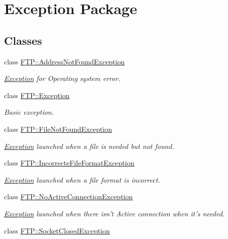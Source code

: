 \hypertarget{group__exception}{\section{Exception Package}
\label{group__exception}
}
\subsection*{Classes}
\begin{DoxyCompactItemize}
\item 
class \hyperlink{classFTP_1_1AddressNotFoundException}{F\-T\-P\-::\-Address\-Not\-Found\-Exception}
\begin{DoxyCompactList}\small\item\em \hyperlink{classFTP_1_1Exception}{Exception} for Operating system error. \end{DoxyCompactList}\item 
class \hyperlink{classFTP_1_1Exception}{F\-T\-P\-::\-Exception}
\begin{DoxyCompactList}\small\item\em Basic exception. \end{DoxyCompactList}\item 
class \hyperlink{classFTP_1_1FileNotFoundException}{F\-T\-P\-::\-File\-Not\-Found\-Exception}
\begin{DoxyCompactList}\small\item\em \hyperlink{classFTP_1_1Exception}{Exception} launched when a file is needed but not found. \end{DoxyCompactList}\item 
class \hyperlink{classFTP_1_1IncorrecteFileFormatException}{F\-T\-P\-::\-Incorrecte\-File\-Format\-Exception}
\begin{DoxyCompactList}\small\item\em \hyperlink{classFTP_1_1Exception}{Exception} launched when a file format is incorrect. \end{DoxyCompactList}\item 
class \hyperlink{classFTP_1_1NoActiveConnectionException}{F\-T\-P\-::\-No\-Active\-Connection\-Exception}
\begin{DoxyCompactList}\small\item\em \hyperlink{classFTP_1_1Exception}{Exception} launched when there isn't Active connection when it's needed. \end{DoxyCompactList}\item 
class \hyperlink{classFTP_1_1SocketClosedException}{F\-T\-P\-::\-Socket\-Closed\-Exception}

\end{DoxyCompactItemize}
